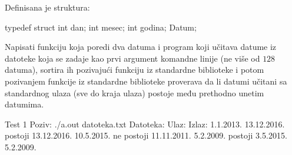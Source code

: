 \begin{Answer}[ref=524]
\end{Answer}
\begin{Exercise}[label=525]
  Definisana je struktura:
  \begin{ckod}
    typedef struct { int dan; int mesec; int godina; } Datum;
  \end{ckod}
  Napisati funkciju koja poredi dva datuma i program koji učitava
  datume iz datoteke koja se zadaje kao prvi argument komandne linije
  (ne više od $128$ datuma), sortira ih pozivajući funkciju
   iz standardne biblioteke i potom pozivanjem funkcije
   iz standardne biblioteke proverava da li datumi
  učitani sa standardnog ulaza (sve do kraja ulaza) postoje među
  prethodno unetim datumima.
  
\begin{maxitest}
\begin{test}{Test 1}
Poziv: ./a.out datoteka.txt
Datoteka:             Ulaz:              Izlaz:
1.1.2013.             13.12.2016.        postoji
13.12.2016.           10.5.2015.         ne postoji
11.11.2011.           5.2.2009.          postoji
3.5.2015.
5.2.2009.
\end{test}
\end{maxitest}
  
\end{Exercise}

